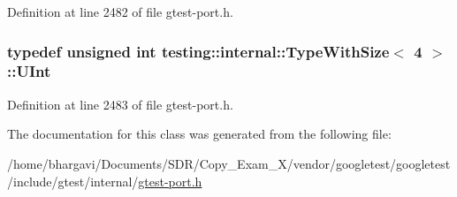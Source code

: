 Definition at line 2482 of file gtest-\/port.\+h.

\subsubsection[{\texorpdfstring{U\+Int}{UInt}}]{\setlength{\rightskip}{0pt plus 5cm}typedef unsigned int {\bf testing\+::internal\+::\+Type\+With\+Size}$<$ 4 $>$\+::{\bf U\+Int}}\hypertarget{classtesting_1_1internal_1_1_type_with_size_3_014_01_4_a7d559570f830bf35d095eeb94d98de58}{}\label{classtesting_1_1internal_1_1_type_with_size_3_014_01_4_a7d559570f830bf35d095eeb94d98de58}


Definition at line 2483 of file gtest-\/port.\+h.



The documentation for this class was generated from the following file\+:\begin{DoxyCompactItemize}
\item 
/home/bhargavi/\+Documents/\+S\+D\+R/\+Copy\+\_\+\+Exam\+\_\+X/vendor/googletest/googletest/include/gtest/internal/\hyperlink{gtest-port_8h}{gtest-\/port.\+h}\end{DoxyCompactItemize}
